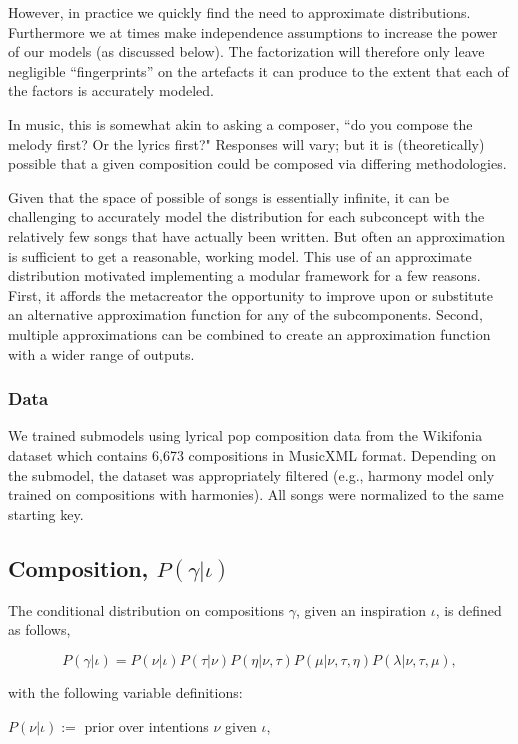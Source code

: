 \documentclass[letterpaper]{article}
\begin{document}
However, in practice we quickly find the need to approximate distributions. Furthermore we at times make independence assumptions to increase the power of our models (as discussed below). The factorization will therefore only leave negligible ``fingerprints'' on the artefacts it can produce to the extent that each of the factors is accurately modeled.

 In music, this is somewhat akin to asking a composer, ``do you compose the melody first? Or the lyrics first?" Responses will vary; but it is (theoretically) possible that a given composition could be composed via differing methodologies.

Given that the space of possible of songs is essentially infinite, it can be challenging to accurately model the distribution for each subconcept with the relatively few songs that have actually been written. But often an approximation is sufficient to get a reasonable, working model. This use of an approximate distribution motivated implementing a modular framework for a few reasons. First, it affords the metacreator the opportunity to improve upon or substitute an alternative approximation function for any of the subcomponents. Second, multiple approximations can be combined to create an approximation function with a wider range of outputs.

\subsubsection{Data}

We trained submodels using lyrical pop composition data from the Wikifonia dataset which contains 6,673 compositions in MusicXML format. Depending on the submodel, the dataset was appropriately filtered (e.g., harmony model only trained on compositions with harmonies). All songs were normalized to the same starting key.

\subsection{Composition, $P(\gamma|\iota)$}

The conditional distribution on compositions $\gamma$, given an inspiration $\iota$, is defined as follows,

\[ P(\gamma|\iota) = P(\nu|\iota)P(\tau|\nu)P(\eta|\nu,\tau)P(\mu|\nu,\tau,\eta)P(\lambda|\nu,\tau,\mu), \] 

\noindent with the following variable definitions:

\(P(\nu|\iota):=\) prior over intentions $\nu$ given $\iota$,
\end{document}
